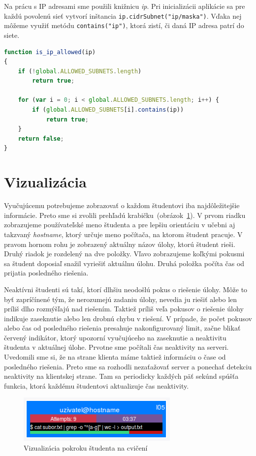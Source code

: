 Na prácu s IP adresami sme použili knižnicu \textit{ip}. Pri inicializácii
aplikácie sa pre každú povolenú sieť vytvorí inštancia
\verb'ip.cidrSubnet("ip/maska")'. Vďaka nej môžeme využiť metódu
\verb'contains("ip")', ktorá zistí, či daná IP adresa patrí do siete.

\begin{lstlisting}[language=JavaScript]
function is_ip_allowed(ip)
{
    if (!global.ALLOWED_SUBNETS.length)
        return true;

    for (var i = 0; i < global.ALLOWED_SUBNETS.length; i++) {
        if (global.ALLOWED_SUBNETS[i].contains(ip))
            return true;
    }
    return false;
}
\end{lstlisting}

\section{Vizualizácia}
\label{sec:vizualization}

Vyučujúcemu potrebujeme zobrazovať o každom študentovi iba najdôležitejšie informácie.
Preto sme si zvolili prehľadú \glqq krabičku\grqq ~(obrázok~\ref{img:userbox}).
V prvom riadku zobrazujeme používateľské meno študenta a pre lepšiu orientáciu
v učebni aj takzvaný \textit{hostname}, ktorý určuje meno počítača, na ktorom
študent pracuje. V pravom hornom rohu je zobrazený aktuálny názov úlohy, ktorú študent
rieši. Druhý riadok je rozdelený na dve položky. Vľavo zobrazujeme koľkými pokusmi
sa študent doposiaľ snažil vyriešiť aktuálnu úlohu. Druhá položka počíta čas od
prijatia posledného riešenia.

Neaktívni študenti sú takí, ktorí dlhšiu neodošlú pokus o
riešenie úlohy. Môže to  byť zapríčínené tým, že nerozumejú zadaniu úlohy, nevedia ju
riešiť alebo len príliš dlho rozmýšľajú nad riešením. Taktiež príliš veľa pokusov
o riešenie úlohy indikuje zaseknutie alebo len drobnú chybu v riešení.
V prípade, že počet pokusov alebo čas od posledného
riešenia presahuje nakonfigurovaný limit, začne blikať červený indikátor, ktorý
upozorní vyučujúceho na zaseknutie a neaktivitu študenta v aktuálnej úlohe.
Prvotne sme počítali čas neaktivity na serveri. Uvedomili sme si, že na strane
klienta máme taktiež informáciu o čase od posledného riešenia. Preto sme sa rozhodli
nezaťažovať server a ponechať detekciu neaktivity na klientskej strane. Tam sa
periodicky každých päť sekúnd spúšťa funkcia, ktorá každému študentovi aktualizuje
čas neaktivity.

\begin{figure}[h]
	\centerline{\includegraphics[width=0.7\textwidth]{images/gta_monitor_box.png}}
	\caption[Vizualizácia pokroku študenta na cvičení]{Vizualizácia pokroku študenta na cvičení}
	\label{img:userbox}
\end{figure}

